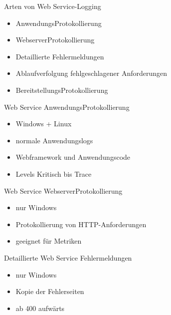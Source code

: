 \begin{flashcard}[Definition]{Arten von Web Service-Logging}
    \begin{itemize}
        \item AnwendungsProtokollierung
        \item WebserverProtokollierung
        \item Detaillierte Fehlermeldungen
        \item Ablaufverfolgung fehlgeschlagener Anforderungen
        \item BereitstellungsProtokollierung
    \end{itemize}
\end{flashcard}

\begin{flashcard}[Definition]{Web Service AnwendungsProtokollierung}
    \begin{itemize}
        \item Windows + Linux
        \item normale Anwendungslogs
        \item Webframework und Anwendungscode
        \item Levels Kritisch bis Trace
    \end{itemize}
\end{flashcard}

\begin{flashcard}[Definition]{Web Service WebserverProtokollierung}
    \begin{itemize}
        \item[!] nur Windows
        \item Protokollierung von HTTP-Anforderungen
        \item geeignet für Metriken
    \end{itemize}
\end{flashcard}

\begin{flashcard}[Definition]{Detaillierte Web Service Fehlermeldungen}
    \begin{itemize}
        \item[!] nur Windows
        \item Kopie der Fehlerseiten
        \item ab 400 aufwärts
    \end{itemize}
\end{flashcard}


